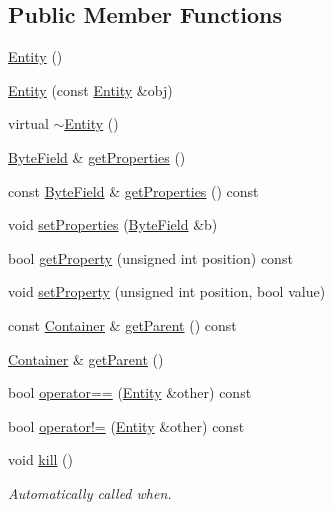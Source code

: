 \subsection*{Public Member Functions}
\begin{DoxyCompactItemize}
\item 
\hyperlink{classmc_1_1_entity_ad583efd4016d2c77f6f60507b55fb6f8}{Entity} ()
\item 
\hyperlink{classmc_1_1_entity_a9b3dbd9aef3eb14da2e84a4352546835}{Entity} (const \hyperlink{classmc_1_1_entity}{Entity} \&obj)
\item 
virtual \hyperlink{classmc_1_1_entity_a5d546959498cbd99c27c0cd03cc95857}{$\sim$\+Entity} ()
\item 
\hyperlink{namespacemc_a4ed352b00f84d2c3e9843cf5ea375ca0}{Byte\+Field} \& \hyperlink{classmc_1_1_entity_afb7e498851027d6dfe5c6e4dbd2e1364}{get\+Properties} ()
\item 
const \hyperlink{namespacemc_a4ed352b00f84d2c3e9843cf5ea375ca0}{Byte\+Field} \& \hyperlink{classmc_1_1_entity_a0e026645818370ea5c5a72817558e89a}{get\+Properties} () const 
\item 
void \hyperlink{classmc_1_1_entity_ae644b908a86a45da6d3620897205d942}{set\+Properties} (\hyperlink{namespacemc_a4ed352b00f84d2c3e9843cf5ea375ca0}{Byte\+Field} \&b)
\item 
bool \hyperlink{classmc_1_1_entity_ace44e845914092b907df3ecaaa50547d}{get\+Property} (unsigned int position) const 
\item 
void \hyperlink{classmc_1_1_entity_ad771c3db0dadcd167df40fb04a1c10af}{set\+Property} (unsigned int position, bool value)
\item 
const \hyperlink{classmc_1_1_container}{Container} \& \hyperlink{classmc_1_1_entity_a6ca2e4084875e5cde83b7e8b6fc012d3}{get\+Parent} () const 
\item 
\hyperlink{classmc_1_1_container}{Container} \& \hyperlink{classmc_1_1_entity_a1900c874fc79eb246d7ec01198264dc8}{get\+Parent} ()
\item 
bool \hyperlink{classmc_1_1_entity_a7918ed0bd53b9f09a0e57f9312eef4cc}{operator==} (\hyperlink{classmc_1_1_entity}{Entity} \&other) const 
\item 
bool \hyperlink{classmc_1_1_entity_a6cb31e44de7988da15b5e811f160c12d}{operator!=} (\hyperlink{classmc_1_1_entity}{Entity} \&other) const 
\item 
void \hyperlink{classmc_1_1_entity_ac627ec2fd2977dee614b96cee332775f}{kill} ()
\begin{DoxyCompactList}\small\item\em Automatically called when. \end{DoxyCompactList}\end{DoxyCompactItemize}
